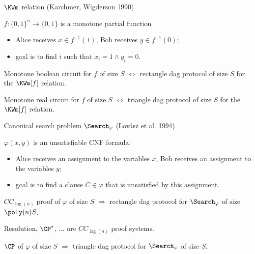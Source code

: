\begin{frame}{$\KWm$ relation (Karchmer, Wigderson 1990)}

    $f\colon \{0, 1\}^n \to \{0, 1\}$ is a monotone partial function
    
    \begin{itemize}
        \item Alice receives $x \in f^{-1}(1)$, Bob receives $y \in f^{-1}(0)$;
        \item goal is to find $i$ such that $x_i = 1 \land y_i = 0$.
    \end{itemize}

    \pause

    \begin{theorem}
        Monotone boolean circuit for $f$ of size $S$ $\Leftrightarrow$ rectangle dag protocol of size $S$
        for the $\KWm[f]$ relation.
    \end{theorem}

    \pause

    \begin{theorem}
        Monotone real circuit for $f$ of size $S$ $\Leftrightarrow$ triangle dag protocol of size $S$
        for the $\KWm[f]$ relation.
    \end{theorem}
\end{frame}


\begin{frame}{Canonical search problem $\Search_{\varphi}$ (Lov{\'{a}}sz et al. 1994)}
    
    $\varphi(x, y)$ is an unsatisfiable CNF formula:
    \begin{itemize}
        \item Alice receives an assignment to the variables $x$, Bob receives an assignment to the
            variables $y$;
        \item goal is to find a clause $C \in \varphi$ that is unsatisfied by this assignment.
    \end{itemize}

    \pause

    \begin{theorem}[Kraj{\'{\i}}{\v{c}}ek 95; S 17]
        $CC_{\log(n)}$ proof of $\varphi$ of size $S$ $\Rightarrow$ rectangle dag protocol for
        $\Search_{\varphi}$ of size $\poly(n) S$.
    \end{theorem}

    Resolution, $\CP^*$, $\dots$ are $CC_{\log(n)}$ proof systems.

    \pause
    
    \begin{theorem}[S 17]
        $\CP$ of $\varphi$ of size $S$ $\Rightarrow$ triangle dag protocol for $\Search_{\varphi}$ of
        size $S$.
    \end{theorem}
\end{frame}